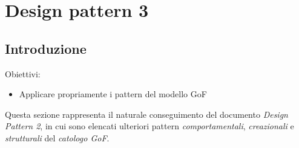 \documentclass{article}
\begin{document}
\pagestyle{empty}
\section*{Design pattern 3}
\large

\subsection*{Introduzione}
\large
Obiettivi:
\begin{itemize}
    \renewcommand{\labelitemi}{-}
    \itemsep0em
    \item Applicare propriamente i pattern del modello GoF 
\end{itemize}
Questa sezione rappresenta il naturale conseguimento del documento \textit{Design Pattern 2}, in cui sono elencati ulteriori pattern \textit{comportamentali}, \textit{creazionali} e \textit{strutturali} del \textit{catologo GoF}.
\end{document}
